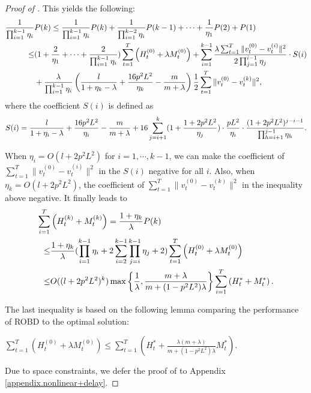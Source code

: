 \begin{proof}[Proof of ]
This yields the following:
\begin{align}
    \frac{1}{\prod_{i=1}^{k-1}\eta_{i}}&P(k)
\le\frac{1}{\prod_{i=1}^{k-1}\eta_{i}}P(k)+\frac{1}{\prod_{i=1}^{k-2}\eta_{i}}P(k-1)+\cdots+\frac{1}{\eta_{1}}P(2)+P(1)\notag\\
\le&(1+\frac{2}{\eta_{1}}+\cdots+\frac{2}{\prod_{i=1}^{k-1}\eta_{i}})\sum_{t=1}^T\left(H_t^{(0)}+\lambda M_t^{(0)}\right)+\sum_{i=1}^{k-1}\frac{\lambda\sum_{t=1}^T\|v_t^{(0)}-v_t^{(i)}\|^2}{2\prod_{j=1}^{i-1}\eta_{j}}\cdot S(i)\notag\\
&+\frac{\lambda}{\prod_{i=1}^{k-1}\eta_{i}}\left(\frac{l}{1+\eta_{k}-\lambda}+\frac{16p^2L^2}{\eta_{k}}-\frac{m}{m+\lambda}\right)\frac{1}{2}\sum_{t=1}^T\|v_t^{(0)}-v_t^{(k)}\|^2,\notag
\end{align}
where the coefficient $S(i)$ is defined as
\begin{align}
    S(i)=\frac{l}{1+\eta_{i}-\lambda}+\frac{16 p^2L^2}{\eta_{i}}-\frac{m}{m+\lambda}+16\sum_{j=i+1}^k(1+\frac{1+2p^2L^2}{\eta_{j}})\cdot\frac{pL^2}{\eta_{i}}\cdot\frac{(1+2p^2L^2)^{j-i-1}}{\prod_{h=i+1}^{j-1}\eta_{h}}.\notag
\end{align}

When $\eta_{i}=O(l+2p^2L^2)$ for $i=1,\cdots,k-1$, we can make the coefficient of $\sum_{t=1}^{T}\|v_t^{(0)}-v_t^{(i)}\|^2$ in the $S(i)$ negative for all $i$. Also, when $\eta_{k}=O(l+2p^2L^2)$, the coefficient of $\sum_{t=1}^{T}\|v_t^{(0)}-v_t^{(k)}\|^2$ in the inequality above negative. It finally leads to
\begin{align}
    \sum_{i=1}^T&\left(H_t^{(k)}+M_t^{(k)}\right)
    =\frac{1+\eta_{k}}{\lambda}P(k)\notag\\
    \le&\frac{1+\eta_{k}}{\lambda}(\prod_{i=1}^{k-1}\eta_{i}+2\sum_{i=2}^{k-1}\prod_{j=i}^{k-1}\eta_{j}+2)\sum_{t=1}^T\left(H_t^{(0)}+\lambda M_t^{(0)}\right)\notag\\
    \le&O((l+2p^2L^2)^k)\max\left\{\frac{1}{\lambda},\frac{m+\lambda}{m+(1-p^2L^2)\lambda}\right\}\sum_{i=1}^T\left(H_t^*+M_t^*\right).\notag
\end{align}

The last inequality is based on the following lemma comparing the performance of ROBD to the optimal solution:
\begin{lemma}\label{appendix.c.lemma}
$\sum_{t=1}^T(H_t^{(0)}+\lambda M_t^{(0)})\le\sum_{t=1}^T\left(H_t^*+\frac{\lambda(m+\lambda)}{m+(1-p^2L^2)\lambda}M_t^*\right).$
\end{lemma}
\noindent Due to space constraints, we defer the proof of  to Appendix \ref{appendix.nonlinear+delay}.
\end{proof}




